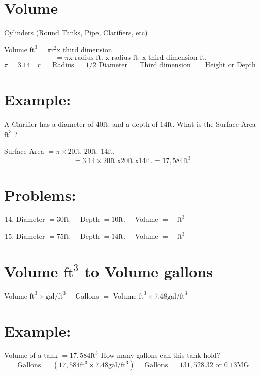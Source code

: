 \documentclass[10pt]{article}
\begin{document}
\section{Volume}
Cylinders (Round Tanks, Pipe, Clarifiers, etc)

Volume $\mathrm{ft}^{3}=\pi \mathrm{r}^{2} \mathrm{x}$ third dimension
$$
=\pi \mathrm{x} \text { radius } \mathrm{ft} \text {. } \mathrm{x} \text { radius } \mathrm{ft} \text {. } \mathrm{x} \text { third dimension } \mathrm{ft} \text {. }
$$
$\pi=3.14 \quad r=$ Radius $=1 / 2$ Diameter $\quad$ Third dimension $=$ Height or Depth

\section{Example:}
A Clarifier has a diameter of $40 \mathrm{ft}$. and a depth of $14 \mathrm{ft}$. What is the Surface Area $\mathrm{ft}^{3}$ ?

Surface Area $=\pi \times 20 \mathrm{ft}$. $20 \mathrm{ft}$. $14 \mathrm{ft}$.
$$
=3.14 \times 20 \mathrm{ft} . \mathrm{x} 20 \mathrm{ft} . \mathrm{x} 14 \mathrm{ft} .=17,584 \mathrm{ft}^{3}
$$

\section{Problems:}
\begin{enumerate}
  \setcounter{enumi}{13}
  \item Diameter $=30 \mathrm{ft} . \quad$ Depth $=10 \mathrm{ft} . \quad$ Volume $=\quad \mathrm{ft}^{3}$

  \item Diameter $=75 \mathrm{ft} . \quad$ Depth $=14 \mathrm{ft} . \quad$ Volume $=\quad \mathrm{ft}^{3}$

\end{enumerate}
\section{Volume $\mathrm{ft}^{3}$ to Volume gallons}
Volume $\mathrm{ft}^{3} \times \mathrm{gal} / \mathrm{ft}^{3} \quad$ Gallons $=$ Volume $\mathrm{ft}^{3} \times 7.48 \mathrm{gal} / \mathrm{ft}^{3}$

\section{Example:}
Volume of a tank $=17,584 \mathrm{ft}^{3}$ How many gallons can this tank hold?
$$
\text { Gallons }=\left(17,584 \mathrm{ft}^{3} \times 7.48 \mathrm{gal} / \mathrm{ft}^{3}\right) \quad \text { Gallons }=131,528.32 \text { or } 0.13 \mathrm{MG}
$$
\end{document}
